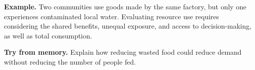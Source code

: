 \documentclass[11pt,letterpaper]{article}
\newcommand{\memorycheck}[1]{\par\smallskip\textbf{Try from memory.} #1\par}
\begin{document}
\textbf{Example.} Two communities use goods made by the same factory, but only one experiences contaminated local water. Evaluating resource use requires considering the shared benefits, unequal exposure, and access to decision-making, as well as total consumption.
\begin{center}
\par
\end{center}
\memorycheck{Explain how reducing wasted food could reduce demand without reducing the number of people fed.}
\end{document}
